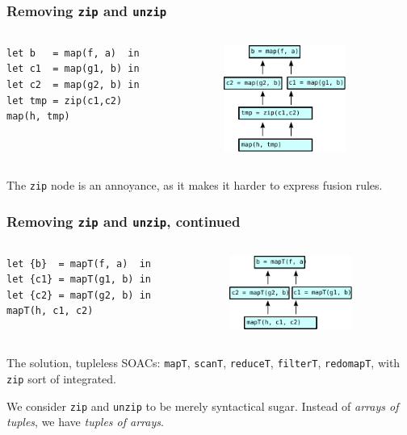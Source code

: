 \documentclass{beamer}
\begin{document}
\begin{frame}[fragile]
  \frametitle{Removing \texttt{zip} and \texttt{unzip}}

  \begin{columns}
    \begin{column}{0.5\textwidth}
\begin{lstlisting}
let b   = map(f, a)  in
let c1  = map(g1, b) in
let c2  = map(g2, b) in
let tmp = zip(c1,c2)
map(h, tmp)
\end{lstlisting}
    \end{column}
    \begin{column}{0.5\textwidth}
      \includegraphics[width=4cm]{img/simpledataflow.pdf}
    \end{column}
  \end{columns}
  \vspace{0.5cm}

  The \texttt{zip} node is an annoyance, as it makes it harder to
  express fusion rules.
\end{frame}

\begin{frame}[fragile]
  \frametitle{Removing \texttt{zip} and \texttt{unzip}, continued}

  \begin{columns}
    \begin{column}{0.6\textwidth}
\begin{lstlisting}
let {b}  = mapT(f, a)  in
let {c1} = mapT(g1, b) in
let {c2} = mapT(g2, b) in
mapT(h, c1, c2)
\end{lstlisting}
    \end{column}
    \begin{column}{0.4\textwidth}
      \includegraphics[width=4cm]{img/simpledataflow-notuples.pdf}
    \end{column}
  \end{columns}
  \vspace{0.5cm}

  The solution, tupleless SOACs: \texttt{mapT}, \texttt{scanT},
  \texttt{reduceT}, \texttt{filterT}, \texttt{redomapT}, with
  \texttt{zip} sort of integrated.

  We consider \texttt{zip} and \texttt{unzip} to be merely syntactical
  sugar.  Instead of \textit{arrays of tuples}, we have \textit{tuples
    of arrays}.
\end{frame}
\end{document}
